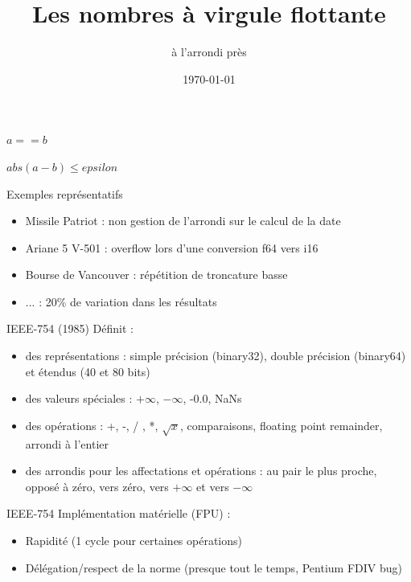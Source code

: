 \documentclass{beamer}
\title{Les nombres à virgule flottante}
\subtitle{à l'arrondi près}
\date{\today}
\begin{document}
  \maketitle
  
\begin{frame}
\begin{Huge}
\begin{center}
$a == b$
\end{center}
\end{Huge}
\end{frame}  
  
\begin{frame}
\begin{Huge}
\begin{center}
$abs(a - b) \leq epsilon$
\end{center}
\end{Huge}
\end{frame}    

        \begin{frame}{Exemples représentatifs}
\begin{itemize}
\item Missile Patriot : non gestion de l'arrondi sur le calcul de la date
\item Ariane 5 V-501 : overflow lors d'une conversion f64 vers i16
\item Bourse de Vancouver : répétition de troncature basse 
\item ... : 20\% de variation dans les résultats
\end{itemize}
  \end{frame}
  
  
  \begin{frame}{IEEE-754 (1985)}
Définit :
    \begin{itemize}
      \item des représentations : simple précision (binary32), double précision (binary64) et étendus (40 et 80 bits)
      \item des valeurs spéciales : $+\infty$, $-\infty$, -0.0, NaNs
      \item des opérations : +, -, / , *, $\sqrt{x}$, comparaisons, floating point remainder, arrondi à l'entier
      \item des arrondis pour les affectations et opérations : au pair le plus proche, opposé à zéro, vers zéro, vers $+\infty$ et vers $-\infty$
    \end{itemize}
  \end{frame}
  
  \begin{frame}{IEEE-754}
    Implémentation matérielle (FPU) : 
    \begin{itemize}
      \item Rapidité (1 cycle pour certaines opérations)
      \item Délégation/respect de la norme (presque tout le temps, Pentium FDIV bug)
    \end{itemize}
  \end{frame}
  
\end{document}
